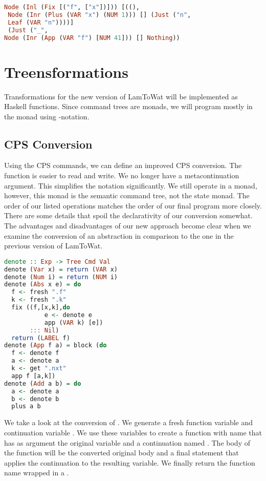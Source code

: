 \begin{lstlisting}[language=Haskell]
Node (Inl (Fix [("f", ["x"])])) [((),
 Node (Inr (Plus (VAR "x") (NUM 1))) [] (Just ("n",
 Leaf (VAR "n"))))]
 (Just ("_",
Node (Inr (App (VAR "f") [NUM 41])) [] Nothing))
\end{lstlisting}

\section{\label{section:treensforms}Treensformations}
Transformations for the new version of LamToWat will be implemented as Haskell functions. Since command trees are monads, we will program mostly in the monad using -notation. 

\subsection{\label{subsection:cpsconvert2}CPS Conversion}
Using the \ac{CPS} commands, we can define an improved \ac{CPS} conversion. The function is easier to read and write. We no longer have a metacontinuation argument. This simplifies the notation significantly. We still operate in a monad, however, this monad is the semantic command tree, not the state monad. The order of our listed operations matches the order of our final program more closely. There are some details that spoil the declarativity of our conversion somewhat. The advantages and disadvantages of our new approach become clear when we examine the conversion of an abstraction in comparison to the one in the previous version of LamToWat.

\begin{lstlisting}[language=Haskell]
denote :: Exp -> Tree Cmd Val
denote (Var x) = return (VAR x)
denote (Num i) = return (NUM i)
denote (Abs x e) = do
  f <- fresh ".f"
  k <- fresh ".k"
  fix ((f,[x,k],do
           e <- denote e
           app (VAR k) [e])
       ::: Nil)
  return (LABEL f)
denote (App f a) = block (do
  f <- denote f
  a <- denote a
  k <- get ".nxt"
  app f [a,k])
denote (Add a b) = do
  a <- denote a
  b <- denote b
  plus a b
\end{lstlisting}

We take a look at the conversion of . We generate a fresh function variable  and continuation variable . We use these variables to create a function with name  that has as argument the original variable and a continuation named . The body of the function will be the converted original body and a final statement that applies the continuation to the resulting variable. We finally return the function name wrapped in a .

